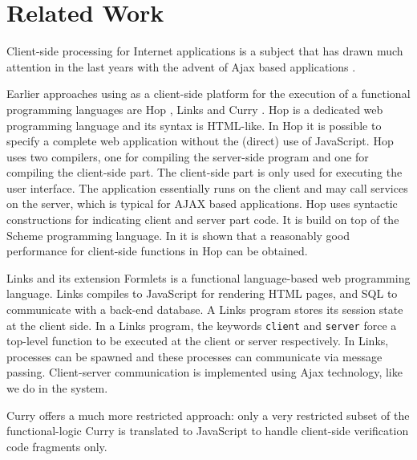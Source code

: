 \section{Related Work}\label{sapljs:sec:related}
Client-side processing for Internet applications is a subject that has drawn much attention in the last years with the advent of \textsf{Ajax} based
applications \cite{AJAX}.

Earlier approaches using \JS as a client-side platform for the execution of a functional programming languages are \textsf{Hop} \cite{HOP1,HOP2},
Links \cite{LINKS1}and \textsf{Curry}  \cite{CURRY}. 
\textsf{Hop} is a dedicated web programming language and its syntax is \textsf{HTML}-like. 
In \textsf{Hop} it is  possible to specify a complete web application without the (direct) use of \textsf{JavaScript}. 
\textsf{Hop} uses two compilers, one for compiling the server-side program and one for compiling the client-side part. 
The client-side part is only used for executing the user interface. 
The application essentially runs on the client and may call services on the server, which is typical for \textsf{AJAX} based applications. 
\textsf{Hop} uses syntactic constructions for indicating client and server part code. It is build on top of the Scheme programming language. 
In \cite{HOP2} it is shown that a reasonably good performance for client-side functions in \textsf{Hop} can be obtained. 

\textsf{Links} \cite{LINKS1} and its extension \textsf{Formlets}  is a functional language-based web programming language. \textsf{Links} compiles to \textsf{JavaScript} for rendering \textsf{HTML} pages, and SQL to communicate with a back-end database. A \textsf{Links} program stores its session state at the client side. In a \textsf{Links} program, the keywords \texttt{client} and \texttt{server} force a top-level function to be executed at the client or server respectively. In \textsf{Links}, processes can be spawned and these processes can communicate via message passing. Client-server communication is implemented using \textsf{Ajax} technology, like we do in the \iTask system. 

 \textsf{Curry} offers a much more restricted approach:
 only a very restricted subset of the functional-logic \textsf{Curry} is translated to \textsf{JavaScript} to handle client-side verification code fragments only.

